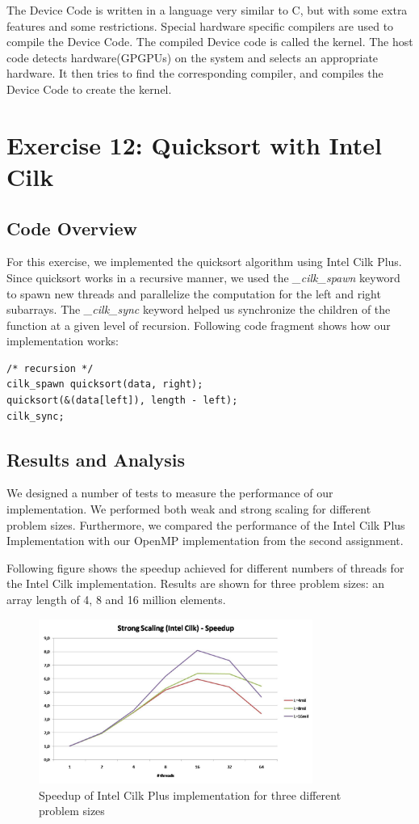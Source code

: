 \documentclass[]{scrartcl}
\begin{document}
The Device Code is written in a language very similar to C, but with some extra features
and some restrictions. Special hardware specific compilers are used to compile the Device Code.
The compiled Device code is called the kernel. The host code detects hardware(GPGPUs) on the 
system and selects an appropriate hardware. It then tries to find the corresponding compiler,
and compiles the Device Code to create the kernel.

\pagebreak
\section{Exercise 12: Quicksort with Intel Cilk}

\subsection{Code Overview}
For this exercise, we implemented the quicksort algorithm using Intel Cilk Plus. 
Since quicksort works in a recursive manner, we used the \textit{\_cilk\_spawn} keyword to spawn 
new threads and parallelize the computation for the left and right subarrays. 
The \textit{\_cilk\_sync} keyword helped us synchronize the children of the function at a given level 
of recursion. 
Following code fragment shows how our implementation works:
	\begin{lstlisting}
/* recursion */
cilk_spawn quicksort(data, right);
quicksort(&(data[left]), length - left);
cilk_sync;
	 \end{lstlisting}

\subsection{Results and Analysis}
We designed a number of tests to measure the performance of our implementation. We performed both weak and strong scaling for different problem sizes. Furthermore, we compared the performance of the Intel Cilk Plus Implementation with our OpenMP implementation from the second assignment.

Following figure shows the speedup achieved for different numbers of threads for the Intel Cilk implementation. Results are shown for three problem sizes: an array length of 4, 8 and 16 million elements. 

\begin{figure}[hb]
	\centering
	\includegraphics[width=0.8\textwidth]{Cilk_speedup}
	\caption{Speedup of Intel Cilk Plus implementation for three different problem sizes}
\end{figure}
\end{document}
